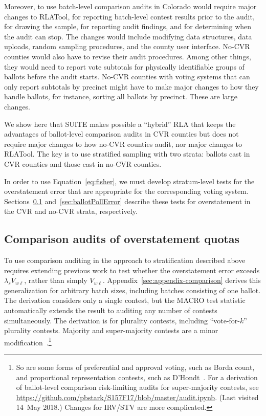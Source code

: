 \documentclass[runningheads]{llncs}
\begin{document}
Moreover, to use batch-level comparison audits in Colorado would require major changes to RLATool, for reporting batch-level contest results prior to the audit, for drawing the sample, for reporting audit findings, and for determining when the audit can stop. 
The changes would include modifying data structures, data uploads, random sampling procedures, and the county user interface.
No-CVR counties would also have to revise their audit procedures.
Among other things, they would need to report vote subtotals
for physically identifiable groups of ballots before the audit starts.
No-CVR counties with voting systems that can only report subtotals by precinct
might have to make major changes to how they handle ballots, for instance, sorting all ballots by precinct.
These are large changes.

We show here that SUITE makes possible a ``hybrid'' RLA that keeps the advantages of ballot-level comparison audits in CVR counties but does not require major changes to how no-CVR counties audit, nor major changes to RLATool. 
The key is to use stratified sampling with two strata: ballots cast in CVR counties and those cast in no-CVR counties.

In order to use Equation~\ref{eq:fisher}, we must develop stratum-level tests for the overstatement error that are appropriate for the corresponding voting system.
Sections~\ref{sec:comparisonError} and~\ref{sec:ballotPollError} describe these tests for overstatement in the CVR and no-CVR strata, respectively.

\subsection{Comparison audits of overstatement quotas}
\label{sec:comparisonError}

To use comparison auditing in the approach to stratification described above requires extending previous work to test whether the overstatement error exceeds $\lambda_s V_{w\ell}$, rather than simply $V_{w\ell}$.
Appendix~\ref{sec:appendix-comparison} derives this generalization for arbitrary batch sizes, including batches consisting of one ballot.
The derivation considers only a single contest, but the 
MACRO test statistic \cite{stark09c,stark10d} automatically extends the result to 
auditing any number of contests simultaneously.
The derivation is for plurality contests, including ``vote-for-$k$'' plurality contests.
Majority and super-majority contests are a minor 
modification~\cite{stark08a}.\footnote{%
  So are some forms of preferential and approval voting, such as Borda count, and
  proportional representation contests, such as D'Hondt~\cite{starkTeague14}.
  For a derivation of ballot-level comparison risk-limiting audits for super-majority contests, 
  see \url{https://github.com/pbstark/S157F17/blob/master/audit.ipynb}. (Last visited 14~May 2018.)
  Changes for IRV/STV are more complicated.
}
\end{document}
